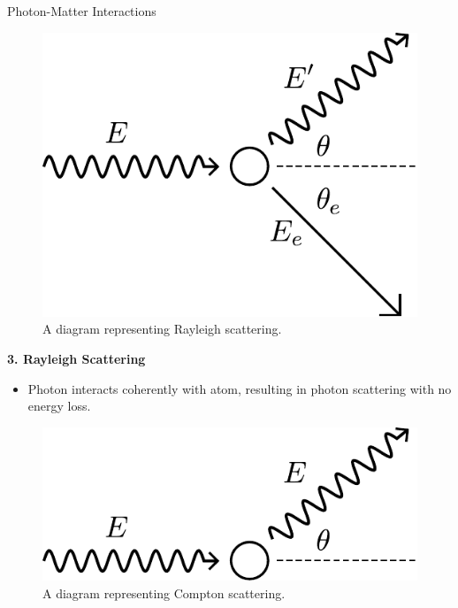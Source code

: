 \documentclass[final]{beamer}
\newlength{\colwidth}
\begin{document}
\begin{frame}[t]
\begin{columns}[t]
\begin{column}{\colwidth}
\begin{block}{Photon-Matter Interactions}
\begin{multicols}{2}
\begin{figure}
        \includegraphics[width = 0.4\colwidth]{compton_diagram.pdf}
        \caption{A diagram representing Rayleigh scattering.}
      \end{figure}

    \end{multicols}

    \begin{center}
      \textbf{3. Rayleigh Scattering}
      \begin{itemize}
        \item Photon interacts coherently with atom, resulting in photon scattering with no energy loss.
      \end{itemize}
      \vspace{-1\baselineskip}
      \begin{figure}
        \includegraphics[width = 0.4\colwidth]{rayleigh_diagram.pdf}
        \caption{A diagram representing Compton scattering.}
      \end{figure}
    \end{center}
    \vspace{-\baselineskip}
  \end{block}


\end{column}
\end{columns}
\end{frame}
\end{document}
